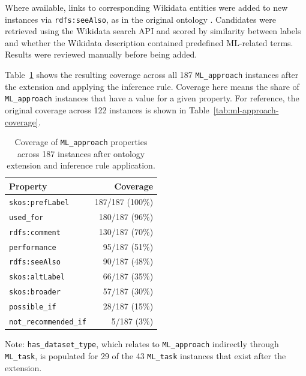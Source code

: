 Where available, links to corresponding Wikidata entities were added 
to new instances via \texttt{rdfs:seeAlso}, as in the original ontology 
\parencite{humm2026industry_ready_machine_learning_ontology}.  
Candidates were retrieved using the Wikidata search API and scored 
by similarity between labels and whether the Wikidata 
description contained predefined ML-related terms. Results were 
reviewed manually before being added.

Table~\ref{tab:ml-approach-coverage-extended} shows the resulting 
coverage across all 187 \texttt{ML\_approach} instances after the 
extension and applying the inference rule. Coverage here means the 
share of \texttt{ML\_approach} instances that have a value for a 
given property. For reference, the original coverage across 122 
instances is shown in Table~\ref{tab:ml-approach-coverage}.

\begin{table}[H]
\centering
\caption[ML\_approach property coverage after extension]{Coverage 
of \texttt{ML\_approach} properties across 187 instances after 
ontology extension and inference rule application.}
\label{tab:ml-approach-coverage-extended}
\begin{tabular}{lr}
\toprule
\textbf{Property} & \textbf{Coverage} \\
\midrule
\texttt{skos:prefLabel}        & 187/187 (100\%) \\
\texttt{used\_for}            & 180/187 (96\%)  \\
\texttt{rdfs:comment}          & 130/187 (70\%)  \\
\texttt{performance}          & 95/187 (51\%)   \\
\texttt{rdfs:seeAlso}          & 90/187 (48\%)   \\
\texttt{skos:altLabel}         & 66/187 (35\%)   \\
\texttt{skos:broader}          & 57/187 (30\%)   \\
\texttt{possible\_if}         & 28/187 (15\%)   \\
\texttt{not\_recommended\_if} & 5/187 (3\%)     \\
\bottomrule
\end{tabular}

\par\vspace{0.5em}
{\footnotesize Note: \texttt{has\_dataset\_type}, which relates to 
\texttt{ML\_approach} indirectly through \texttt{ML\_task}, is 
populated for 29 of the 43 \texttt{ML\_task} instances that exist 
after the extension.}
\end{table}

